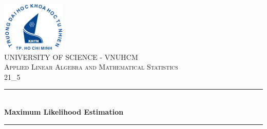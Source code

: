 \documentclass[12pt]{article}
\begin{document}
\newcommand{\HRule}{\rule{\linewidth}{1mm}} %

\begin{center}


\includegraphics[width=3cm]{logo/rsz_3logo-khtn.png}\\[1cm] %


\textsc{\LARGE UNIVERSITY OF SCIENCE - VNUHCM}\\[1cm]
\textsc{\large Applied Linear Algebra and Mathematical Statistics }\\[0.5cm]
\textsc{\Large 21\_5}\\[1.5cm]



\HRule \\[0.5cm]
{ \huge \bfseries Maximum Likelihood Estimation }\\[0.2cm]
\HRule \\[1.5cm]

\tableofcontents


\end{center}
\end{document}

